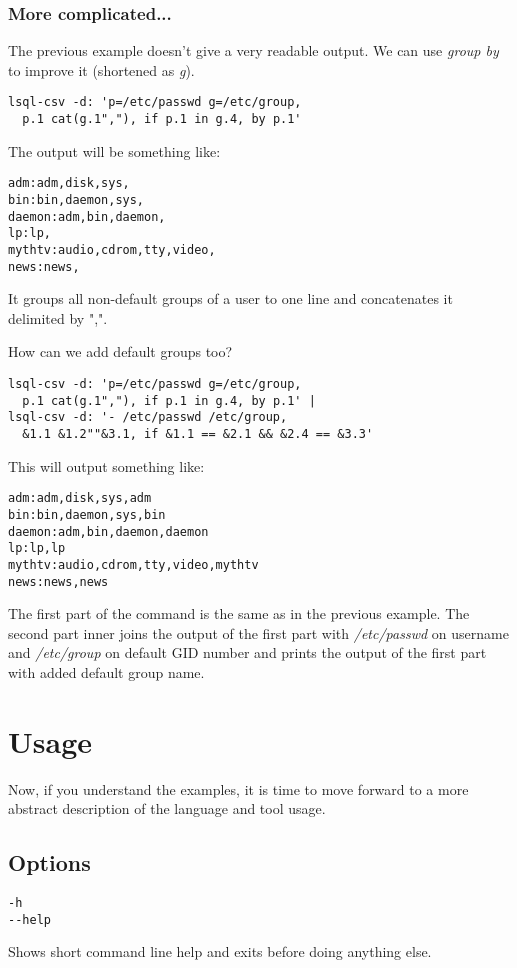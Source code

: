 \subsubsection{More complicated...}
The previous example doesn't give a very readable output. We can use \textit{group by} to improve it (shortened as \textit{g}).
\begin{verbatim}
lsql-csv -d: 'p=/etc/passwd g=/etc/group, 
  p.1 cat(g.1","), if p.1 in g.4, by p.1'
\end{verbatim}
The output will be something like:
\begin{verbatim}
adm:adm,disk,sys,
bin:bin,daemon,sys,
daemon:adm,bin,daemon,
lp:lp,
mythtv:audio,cdrom,tty,video,
news:news,
\end{verbatim}
It groups all non-default groups of a user to one line and concatenates it delimited by ",".

How can we add default groups too?
\begin{verbatim}
lsql-csv -d: 'p=/etc/passwd g=/etc/group, 
  p.1 cat(g.1","), if p.1 in g.4, by p.1' |
lsql-csv -d: '- /etc/passwd /etc/group, 
  &1.1 &1.2""&3.1, if &1.1 == &2.1 && &2.4 == &3.3'
\end{verbatim}
This will output something like:
\begin{verbatim}
adm:adm,disk,sys,adm
bin:bin,daemon,sys,bin
daemon:adm,bin,daemon,daemon
lp:lp,lp
mythtv:audio,cdrom,tty,video,mythtv
news:news,news
\end{verbatim}

The first part of the command is the same as in the previous example. The second part inner joins the output
of the first part with \textit{/etc/passwd} on username and \textit{/etc/group} on default GID number and prints
the output of the first part with added default group name.



\section{Usage}
Now, if you understand the examples, it is time to move forward to a more abstract description of the language and tool usage.

\subsection{Options}
\begin{verbatim}
-h
--help
\end{verbatim}
Shows short command line help and exits before doing anything else.

